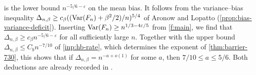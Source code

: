  is the lower bound $n^{-5/6-\varepsilon}$ on the mean
bias. It follows from the variance--bias inequality
$\Delta_{n,\beta}\ge c_\beta((\operatorname{Var}(F_n)+\beta^2/2)/n)^{5/4}$ of Aronow and
Lopatto \cite[Lemma~7.4 and Remark~7.14]{quantitative-parisi}
(\cref{prop:bias-variance-deficit}). Inserting
$\operatorname{Var}(F_n)\ge n^{1/3-4\varepsilon/5}$ from \cref{f:main}, we find that
$\Delta_{n,\beta}\ge c_\beta n^{-5/6-\varepsilon}$ for all sufficiently large
$n$. Together with the upper bound $\Delta_{n,\beta}\le C_bn^{-7/10}$ of
\cref{inp:hb-rate}, which determines the exponent of \cref{thm:barrier-730}, this
shows that if $\Delta_{n,\beta}=n^{-a+o(1)}$ for some $a$, then
$7/10\le a\le5/6$. Both deductions are already recorded in
\cite[Section~1.6]{hexagon-bias}.

